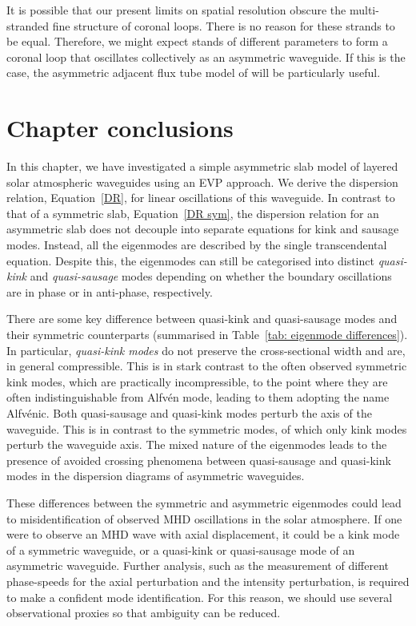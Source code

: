 \documentclass[12pt,draft]{../style-files/ociamthesis}
\begin{document}
It is possible that our present limits on spatial resolution obscure the multi-stranded fine structure of coronal loops. There is no reason for these strands to be equal. Therefore, we might expect stands of different parameters to form a coronal loop that oscillates collectively as an asymmetric waveguide. If this is the case, the asymmetric adjacent flux tube model of \cite{van_etal08} will be particularly useful.


\section{Chapter conclusions}
\label{sec: chpt 2 conc}

In this chapter, we have investigated a simple asymmetric slab model of layered solar atmospheric waveguides using an EVP approach. We derive the dispersion relation, Equation~\eqref{DR}, for linear oscillations of this waveguide. In contrast to that of a symmetric slab, Equation~\eqref{DR sym}, the dispersion relation for an asymmetric slab does not decouple into separate equations for kink and sausage modes. Instead, all the eigenmodes are described by the single transcendental equation. Despite this, the eigenmodes can still be categorised into distinct \textit{quasi-kink} and \textit{quasi-sausage} modes depending on whether the boundary oscillations are in phase or in anti-phase, respectively.

There are some key difference between quasi-kink and quasi-sausage modes and their symmetric counterparts (summarised in Table~\ref{tab: eigenmode differences}). In particular, \textit{quasi-kink modes} do not preserve the cross-sectional width and are, in general compressible. This is in stark contrast to the often observed symmetric kink modes, which are practically incompressible, to the point where they are often indistinguishable from Alfv\'{e}n mode, leading to them adopting the name Alfv\'{e}nic. Both quasi-sausage and quasi-kink modes perturb the axis of the waveguide. This is in contrast to the symmetric modes, of which only kink modes perturb the waveguide axis. The mixed nature of the eigenmodes leads to the presence of avoided crossing phenomena between quasi-sausage and quasi-kink modes in the dispersion diagrams of asymmetric waveguides.

These differences between the symmetric and asymmetric eigenmodes could lead to misidentification of observed MHD oscillations in the solar atmosphere. If one were to observe an MHD wave with axial displacement, it could be a kink mode of a symmetric waveguide, or a quasi-kink or quasi-sausage mode of an asymmetric waveguide. Further analysis, such as the measurement of different phase-speeds for the axial perturbation and the intensity perturbation, is required to make a confident mode identification. For this reason, we should use several observational proxies so that ambiguity can be reduced.
\end{document}

